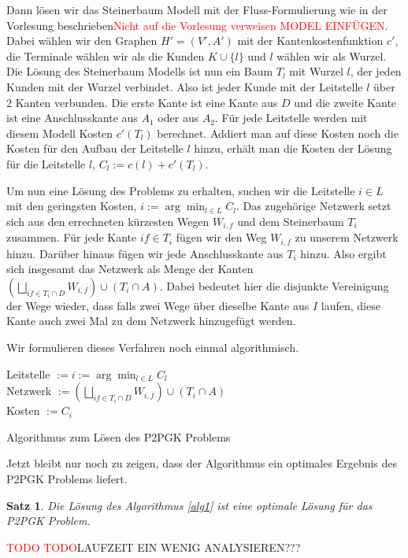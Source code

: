 \documentclass[11pt,a4paper]{article}
\makeatletter
\newcommand{\TODO}{\textcolor{red}{TODO}}
\theoremstyle{my_th_style1}
\newtheorem{satz}{Satz}
\renewenvironment{proof}[1][\proofname]{\par 
	\pushQED{\qed}%
	\normalfont \topsep6\p@\@plus6\p@\relax 
	\trivlist 
	\item[\hskip\labelsep 
	\bfseries 
	#1\@addpunct{:}]\ignorespaces 
}{%
\popQED\endtrivlist\@endpefalse 
}
\makeatother
\begin{document}
Dann lösen wir das Steinerbaum Modell mit der Fluss-Formulierung wie in der Vorlesung beschrieben\textcolor{red}{Nicht auf die Vorlesung verweisen MODEL EINFÜGEN}.
Dabei wählen wir den Graphen $H'=(V',A')$ mit der Kantenkostenfunktion $c'$, die Terminale wählen wir als die Kunden $K \cup \{l\}$ und $l$ w\"ahlen wir als Wurzel. 
Die Lösung des Steinerbaum Modells ist nun ein Baum $T_l$ mit Wurzel $l$, der jeden Kunden mit der Wurzel verbindet. 
Also ist jeder Kunde mit der Leitstelle $l$ über 2 Kanten verbunden. Die erste Kante ist eine Kante aus $D$ und die zweite Kante ist eine Anschlusskante aus $A_1$ oder aus $A_2$. 
Für jede Leitstelle werden mit diesem Modell Kosten $c'(T_l)$ berechnet. 
Addiert man auf diese Kosten noch die Kosten für den Aufbau der Leitstelle $l$ hinzu, erhält man die Kosten der Lösung für die Leitstelle \(l\), $C_l:=c(l)+c'(T_l)$.

Um nun eine Lösung des Problems zu erhalten, suchen wir die Leitstelle $i \in L$ mit den geringsten Kosten, $i:=\arg \displaystyle\min_{l \in L} C_l$.
Das zugehörige Netzwerk setzt sich aus den errechneten kürzesten Wegen  $W_{i,f}$ und dem Steinerbaum $T_i$ zusammen.
Für jede Kante $if \in T_i$ fügen wir den Weg $W_{i,f}$ zu unserem Netzwerk hinzu.
Darüber hinaus fügen wir jede Anschlusskante aus $T_i$ hinzu. Also ergibt sich insgesamt das Netzwerk als Menge der Kanten $(\bigsqcup_{if \in T_i \cap D} W_{i,f}) \cup (T_i\cap A)$.
Dabei bedeutet hier die disjunkte Vereinigung der Wege wieder, dass falls zwei Wege \"uber dieselbe Kante aus \(I\) laufen, diese Kante auch zwei Mal zu dem Netzwerk hinzugef\"ugt werden.

Wir formulieren dieses Verfahren noch einmal algorithmisch.

\vspace{0.5cm}
\begin{algorithm}[H]
	\label{alg1}
\BlankLine

	Leitstelle $:=i:=\arg \displaystyle\min_{l \in L} C_l$\\
	Netzwerk $:=(\bigsqcup_{if \in T_i \cap D}W_{i,f}) \cup (T_i\cap A)$\\
	Kosten $:=C_{i}$
	\BlankLine
\caption{Algorithmus zum Lösen des P2PGK Problems}
\end{algorithm}
\vspace{0.5cm}
Jetzt bleibt nur noch zu zeigen, dass der Algorithmus ein optimales Ergebnis des P2PGK Problems liefert.
\begin{satz}
	Die Lösung des Algorithmus \ref{alg1} ist eine optimale Lösung für das P2PGK Problem.
\end{satz}
\begin{proof}
	\TODO
\end{proof}
\TODO LAUFZEIT EIN WENIG ANALYSIEREN???
\end{document}
